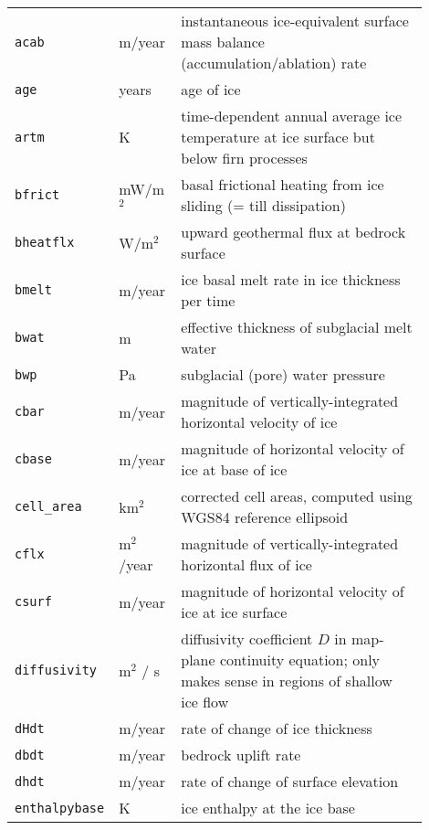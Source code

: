 \tablelasttail{\bottomrule}

\begin{center}
  \begin{xtabular}{p{0.15\linewidth}p{0.15\linewidth}p{0.6\linewidth}}
    \label{tab:extra-vars}
    \texttt{acab} &m/year & instantaneous ice-equivalent surface mass balance (accumulation/ablation) rate \\
    \texttt{age} & years & age of ice \\
    \texttt{artm} & K & time-dependent annual average ice temperature at ice surface but below firn processes\\
    \texttt{bfrict} & mW/m$^{2}$ & basal frictional heating from ice sliding (= till dissipation) \\
    \texttt{bheatflx} & W/m$^{2}$ & upward geothermal flux at bedrock surface \\
    \texttt{bmelt} & m/year & ice basal melt rate in ice thickness per time \\
    \texttt{bwat} & m & effective thickness of subglacial melt water \\
    \texttt{bwp} & Pa & subglacial (pore) water pressure \\
    \texttt{cbar} & m/year & magnitude of vertically-integrated horizontal velocity of ice \\
    \texttt{cbase} & m/year & magnitude of horizontal velocity of ice at base of ice \\
    \texttt{cell_area} & km$^{2}$ & corrected cell areas, computed using WGS84
    reference ellipsoid\\
    \texttt{cflx} & m$^{2}$/year & magnitude of vertically-integrated horizontal flux of ice \\
    \texttt{csurf} & m/year & magnitude of horizontal velocity of ice at ice
    surface \\
   \texttt{diffusivity} & m$^{2}$ / s & diffusivity coefficient $D$ in
    map-plane continuity equation; only makes sense in regions of shallow ice
    flow \\
    \texttt{dHdt} & m/year & rate of change of ice thickness \\
    \texttt{dbdt} & m/year& bedrock uplift rate \\
    \texttt{dhdt} & m/year& rate of change of surface elevation \\
    \texttt{enthalpybase} & K & ice enthalpy at the ice base\\

\end{xtabular}
\end{center}
